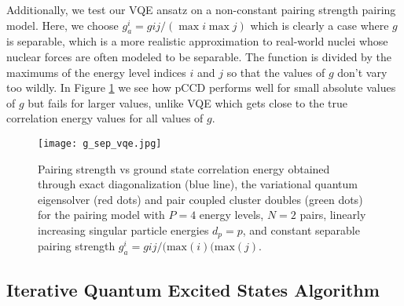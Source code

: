 \documentclass[Dual]{msu-thesis}
\begin{document}


Additionally, we test our VQE ansatz on a non-constant pairing strength pairing model. Here, we choose $g^i_a=gij/(\max{i}\max{j})$ which is clearly a case where $g$ is separable, which is a more realistic approximation to real-world nuclei whose nuclear forces are often modeled to be separable. The function is divided by the maximums of the energy level indices $i$ and $j$ so that the values of $g$ don't vary too wildly. In Figure \ref{fig:g_sep_vqe} we see how pCCD performs well for small absolute values of $g$ but fails for larger values, unlike VQE which gets close to the true correlation energy values for all values of $g$.

\begin{figure}[t]
    \centering
    \texttt{[image: g\_sep\_vqe.jpg]}
    \caption
    {Pairing strength vs ground state correlation energy obtained through exact diagonalization (blue line), the variational quantum eigensolver (red dots) and pair coupled cluster doubles (green dots) for the pairing model with $P=4$ energy levels, $N=2$ pairs, linearly increasing singular particle energies $d_p=p$, and constant separable pairing strength $g^i_a=gij/(\text{max}(i)(\text{max}(j)$.}
    \label{fig:g_sep_vqe}
\end{figure}

\subsection{Iterative Quantum Excited States Algorithm}
\end{document}
